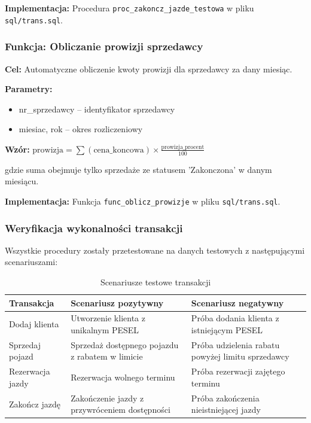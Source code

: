 \documentclass[a4paper,titleauthor]{mwart}
\begin{document}
	\textbf{Implementacja:} Procedura \texttt{proc\_zakoncz\_jazde\_testowa} w pliku \texttt{sql/trans.sql}.

	\subsubsection{Funkcja: Obliczanie prowizji sprzedawcy}

	\textbf{Cel:} Automatyczne obliczenie kwoty prowizji dla sprzedawcy za dany miesiąc.

	\textbf{Parametry:}
	\begin{itemize}
		\item nr\_sprzedawcy -- identyfikator sprzedawcy
		\item miesiac, rok -- okres rozliczeniowy
	\end{itemize}

	\textbf{Wzór:} $\text{prowizja} = \sum(\text{cena\_koncowa}) \times \frac{\text{prowizja\_procent}}{100}$

	gdzie suma obejmuje tylko sprzedaże ze statusem 'Zakonczona' w danym miesiącu.

	\textbf{Implementacja:} Funkcja \texttt{func\_oblicz\_prowizje} w pliku \texttt{sql/trans.sql}.

	\subsubsection{Weryfikacja wykonalności transakcji}

	Wszystkie procedury zostały przetestowane na danych testowych z następującymi scenariuszami:

	\begin{table}[H]
	\centering
	\begin{tabular}{|l|p{5cm}|p{5cm}|}
	\hline
	\textbf{Transakcja} & \textbf{Scenariusz pozytywny} & \textbf{Scenariusz negatywny} \\
	\hline
	Dodaj klienta & Utworzenie klienta z unikalnym PESEL & Próba dodania klienta z istniejącym PESEL \\
	\hline
	Sprzedaj pojazd & Sprzedaż dostępnego pojazdu z rabatem w limicie & Próba udzielenia rabatu powyżej limitu sprzedawcy \\
	\hline
	Rezerwacja jazdy & Rezerwacja wolnego terminu & Próba rezerwacji zajętego terminu \\
	\hline
	Zakończ jazdę & Zakończenie jazdy z przywróceniem dostępności & Próba zakończenia nieistniejącej jazdy \\
	\hline
	\end{tabular}
	\caption{Scenariusze testowe transakcji}
	\end{table}
\end{document}
